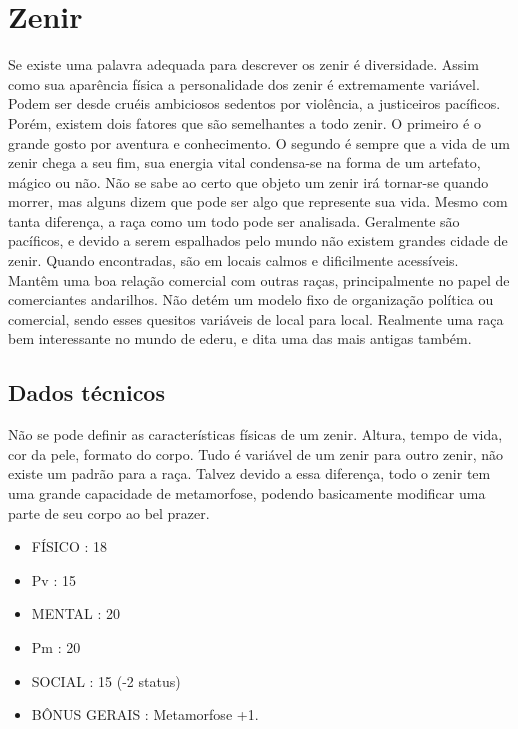 \section{Zenir}

Se existe uma palavra adequada para descrever os zenir é diversidade. Assim como sua aparência física a personalidade dos zenir é extremamente variável. Podem ser desde cruéis ambiciosos sedentos por violência, a justiceiros pacíficos. Porém, existem dois fatores que são semelhantes a todo zenir. O primeiro é o grande gosto por aventura e conhecimento. O segundo é sempre que a vida de um zenir chega a seu fim, sua energia vital condensa-se na forma de um artefato, mágico ou não. Não se sabe ao certo que objeto um zenir irá tornar-se quando morrer, mas alguns dizem que pode ser algo que represente sua vida.
Mesmo com tanta diferença, a raça como um todo pode ser analisada. Geralmente são pacíficos, e devido a serem espalhados pelo mundo não existem grandes cidade de zenir. Quando encontradas, são em locais calmos e dificilmente acessíveis. Mantêm uma boa relação comercial com outras raças, principalmente no papel de comerciantes andarilhos. Não detém um modelo fixo de organização política ou comercial, sendo esses quesitos variáveis de local para local.
Realmente uma raça bem interessante no mundo de ederu, e dita uma das mais antigas também.


\subsection{Dados técnicos}

Não se pode definir as características físicas de um zenir. Altura, tempo de vida, cor da pele, formato do corpo. Tudo é variável de um zenir para outro zenir, não existe um padrão para a raça. Talvez devido a essa diferença, todo o zenir tem uma grande capacidade de metamorfose, podendo basicamente modificar uma parte de seu corpo ao bel prazer.


\begin{itemize}
	\item FÍSICO : 18
	\item Pv : 15 

	\item MENTAL : 20
	\item Pm : 20

	\item SOCIAL : 15 (-2 status)

	\item BÔNUS GERAIS : Metamorfose +1.
\end{itemize}

